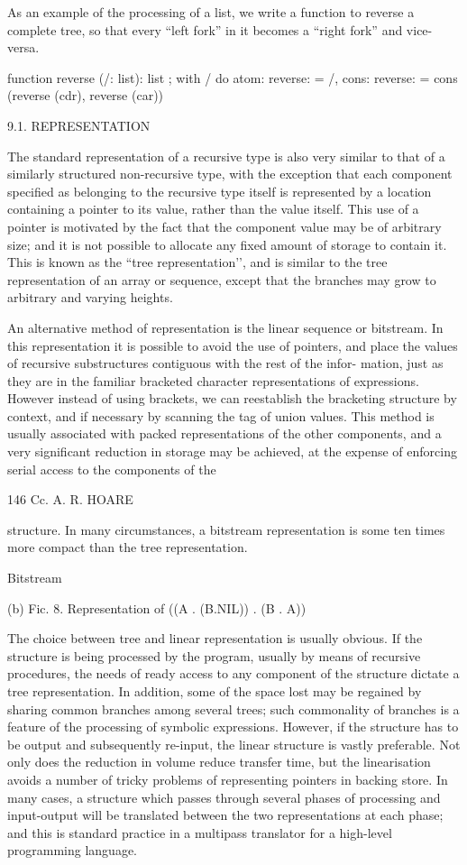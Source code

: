 {{		As an example of the processing of a list, we write a function to reverse a complete tree, so that every “left fork” in it becomes a “right fork” and vice-versa.
		
		function reverse (/: list): list ; with / do {atom: reverse: = /, cons: reverse: = cons (reverse (cdr), reverse (car))}
		
		9.1. REPRESENTATION
		
		The standard representation of a recursive type is also very similar to that of a similarly structured non-recursive type, with the exception that each component specified as belonging to the recursive type itself is represented by a location containing a pointer to its value, rather than the value itself. This use of a pointer is motivated by the fact that the component value may be of arbitrary size; and it is not possible to allocate any fixed amount of storage to contain it. This is known as the “tree representation’’, and is similar to the tree representation of an array or sequence, except that the branches may grow to arbitrary and varying heights.
		
		An alternative method of representation is the linear sequence or bitstream. In this representation it is possible to avoid the use of pointers, and place the values of recursive substructures contiguous with the rest of the infor- mation, just as they are in the familiar bracketed character representations of expressions. However instead of using brackets, we can reestablish the bracketing structure by context, and if necessary by scanning the tag of union values. This method is usually associated with packed representations of the other components, and a very significant reduction in storage may be achieved, at the expense of enforcing serial access to the components of the
		
		146 Cc. A. R. HOARE
		
		structure. In many circumstances, a bitstream representation is some ten times more compact than the tree representation.
		
		
		
		Bitstream
		
		(b) Fic. 8. Representation of ((A . (B.NIL)) . (B . A))
		
		The choice between tree and linear representation is usually obvious. If the structure is being processed by the program, usually by means of recursive procedures, the needs of ready access to any component of the structure dictate a tree representation. In addition, some of the space lost may be regained by sharing common branches among several trees; such commonality of branches is a feature of the processing of symbolic expressions. However, if the structure has to be output and subsequently re-input, the linear structure is vastly preferable. Not only does the reduction in volume reduce transfer time, but the linearisation avoids a number of tricky problems of representing pointers in backing store. In many cases, a structure which passes through several phases of processing and input-output will be translated between the two representations at each phase; and this is standard practice in a multipass translator for a high-level programming language.
		
}}
